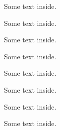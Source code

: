 \documentclass{article}
\begin{document}
\begin{framedd}
  \bcbombe  \tcblower  Some text inside.
\end{framedd}

\begin{framedd}[colback=blue!40!green]
  \bclampe   \tcblower  Some text inside.
\end{framedd} 

\begin{framedd}
  \bcattention  \bcinterdit  \tcblower
  Some text inside.
\end{framedd}

\begin{framedd}[colback=blue!40!green]
   \bcnucleaire  \tcblower
  Some text inside.
\end{framedd}

\begin{framedd}[colback=blue!40!green]
 \bcdanger \tcblower
  Some text inside.
\end{framedd}

\begin{framedd}
  \bcquestion \tcblower
  Some text inside.
\end{framedd}

\begin{framedd}[colback=blue!40!green, lefthand width=2.5cm]
  \bcsoleil  \bceclaircie \bcpluie  \bcneige \tcblower
  Some text inside.
\end{framedd}

\begin{framedd}[lefthand width=3cm]
  \bccube \bcdodecaedre \bcicosaedre \bcoctaedre \bctetraedre  \tcblower
  Some text inside.
\end{framedd}
\end{document}
